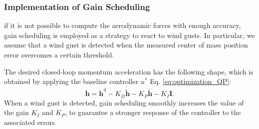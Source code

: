 \subsubsection*{Implementation of Gain Scheduling}

if it is not possible to compute the aerodynamic forces with enough accuracy, gain scheduling is employed as a strategy to react to wind gusts. In particular, we assume that a wind gust is detected when the measured center of mass position error overcomes a certain threshold.

The desired closed-loop momentum acceleration has the following shape, which is obtained by applying the baseline controller $u^*$ Eq. \eqref{eq:optimization_QP}:
\begin{equation}
\label{eq:hddot_des}
   \ddot{\boldsymbol{h}} = \ddot{\boldsymbol{h}}^d -K_D\dot{\tilde{\boldsymbol{h}}} -K_P\tilde{{\boldsymbol{h}}} -K_I \boldsymbol{I}.
\end{equation}
When a wind gust is detected, gain scheduling smoothly increases the value of the gain $K_I$ and $K_P$, to guarantee a stronger response of the controller to the associated errors.